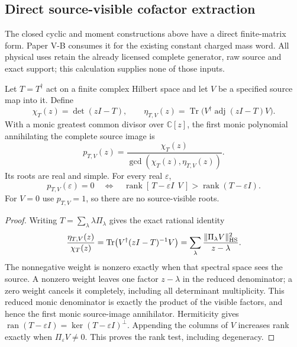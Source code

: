 \documentclass[12pt,a4paper]{article}
\begin{document}





\subsection{Direct source-visible cofactor extraction}
\label{p4:sec:v2191-source-cofactor}
The closed cyclic and moment constructions above have a direct finite-matrix
form. Paper V-B consumes it for the existing constant charged mass word.
All physical uses retain the already licensed complete generator, raw source
and exact support; this calculation supplies none of those inputs.

\begin{theorem}
\label{p4:thm:v2191-source-cofactor}
Let $T=T^\dagger$ act on a finite complex Hilbert space and let $V$ be a
specified source map into it. Define
\[
 \chi_T(z)=\det(zI-T),\qquad
 \eta_{T,V}(z)=\operatorname{Tr}
       \bigl(V^\dagger\operatorname{adj}(zI-T)V\bigr).
\]
With a monic greatest common divisor over $\mathbb C[z]$, the first monic
polynomial annihilating the complete source image is
\[
 \boxed{p_{T,V}(z)=
   \frac{\chi_T(z)}{\gcd(\chi_T(z),\eta_{T,V}(z))}.}
\]
Its roots are real and simple. For every real $\varepsilon$,
\[
 \boxed{p_{T,V}(\varepsilon)=0
 \quad\Longleftrightarrow\quad
 \operatorname{rank}[\,T-\varepsilon I\ \ V\,]
       >\operatorname{rank}(T-\varepsilon I).}
\]
For $V=0$ use $p_{T,V}=1$, so there are no source-visible roots.
\end{theorem}
\begin{proof}
Writing $T=\sum_\lambda\lambda\Pi_\lambda$ gives the exact rational identity
\[
 \frac{\eta_{T,V}(z)}{\chi_T(z)}
 =\operatorname{Tr}\bigl(V^\dagger(zI-T)^{-1}V\bigr)
 =\sum_\lambda\frac{\|\Pi_\lambda V\|_{\rm HS}^2}{z-\lambda}.
\]
The nonnegative weight is nonzero exactly when that spectral space sees the
source. A nonzero weight leaves one factor $z-\lambda$ in the reduced
denominator; a zero weight cancels it completely, including all determinant
multiplicity. This reduced monic denominator is exactly the product of
the visible factors, and hence the first monic source-image annihilator.
Hermiticity gives
$\operatorname{ran}(T-\varepsilon I)=\ker(T-\varepsilon I)^\perp$.
Appending the columns of $V$ increases rank exactly when
$\Pi_\varepsilon V\ne0$. This proves the rank test, including degeneracy.
\end{proof}
\end{document}
